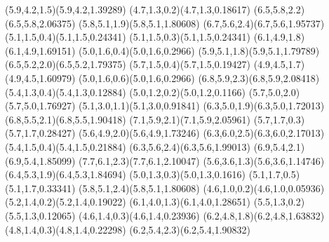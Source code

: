 \pstThreeDLine[linecolor=black](5.9,4.2,1.5)(5.9,4.2,1.39289)
\pstThreeDLine[linecolor=black](4.7,1.3,0.2)(4.7,1.3,0.18617)
\pstThreeDLine[linecolor=black](6.5,5.8,2.2)(6.5,5.8,2.06375)
\pstThreeDLine[linecolor=black](5.8,5.1,1.9)(5.8,5.1,1.80608)
\pstThreeDLine[linecolor=black](6.7,5.6,2.4)(6.7,5.6,1.95737)
\pstThreeDLine[linecolor=black](5.1,1.5,0.4)(5.1,1.5,0.24341)
\pstThreeDLine[linecolor=black](5.1,1.5,0.3)(5.1,1.5,0.24341)
\pstThreeDLine[linecolor=black](6.1,4.9,1.8)(6.1,4.9,1.69151)
\pstThreeDLine[linecolor=black](5.0,1.6,0.4)(5.0,1.6,0.2966)
\pstThreeDLine[linecolor=black](5.9,5.1,1.8)(5.9,5.1,1.79789)
\pstThreeDLine[linecolor=black](6.5,5.2,2.0)(6.5,5.2,1.79375)
\pstThreeDLine[linecolor=black](5.7,1.5,0.4)(5.7,1.5,0.19427)
\pstThreeDLine[linecolor=black](4.9,4.5,1.7)(4.9,4.5,1.60979)
\pstThreeDLine[linecolor=black](5.0,1.6,0.6)(5.0,1.6,0.2966)
\pstThreeDLine[linecolor=black](6.8,5.9,2.3)(6.8,5.9,2.08418)
\pstThreeDLine[linecolor=black](5.4,1.3,0.4)(5.4,1.3,0.12884)
\pstThreeDLine[linecolor=black](5.0,1.2,0.2)(5.0,1.2,0.1166)
\pstThreeDLine[linecolor=black](5.7,5.0,2.0)(5.7,5.0,1.76927)
\pstThreeDLine[linecolor=black](5.1,3.0,1.1)(5.1,3.0,0.91841)
\pstThreeDLine[linecolor=black](6.3,5.0,1.9)(6.3,5.0,1.72013)
\pstThreeDLine[linecolor=black](6.8,5.5,2.1)(6.8,5.5,1.90418)
\pstThreeDLine[linecolor=black](7.1,5.9,2.1)(7.1,5.9,2.05961)
\pstThreeDLine[linecolor=black](5.7,1.7,0.3)(5.7,1.7,0.28427)
\pstThreeDLine[linecolor=black](5.6,4.9,2.0)(5.6,4.9,1.73246)
\pstThreeDLine[linecolor=black](6.3,6.0,2.5)(6.3,6.0,2.17013)
\pstThreeDLine[linecolor=black](5.4,1.5,0.4)(5.4,1.5,0.21884)
\pstThreeDLine[linecolor=black](6.3,5.6,2.4)(6.3,5.6,1.99013)
\pstThreeDLine[linecolor=black](6.9,5.4,2.1)(6.9,5.4,1.85099)
\pstThreeDLine[linecolor=black](7.7,6.1,2.3)(7.7,6.1,2.10047)
\pstThreeDLine[linecolor=black](5.6,3.6,1.3)(5.6,3.6,1.14746)
\pstThreeDLine[linecolor=black](6.4,5.3,1.9)(6.4,5.3,1.84694)
\pstThreeDLine[linecolor=black](5.0,1.3,0.3)(5.0,1.3,0.1616)
\pstThreeDLine[linecolor=black](5.1,1.7,0.5)(5.1,1.7,0.33341)
\pstThreeDLine[linecolor=black](5.8,5.1,2.4)(5.8,5.1,1.80608)
\pstThreeDLine[linecolor=black](4.6,1.0,0.2)(4.6,1.0,0.05936)
\pstThreeDLine[linecolor=black](5.2,1.4,0.2)(5.2,1.4,0.19022)
\pstThreeDLine[linecolor=black](6.1,4.0,1.3)(6.1,4.0,1.28651)
\pstThreeDLine[linecolor=black](5.5,1.3,0.2)(5.5,1.3,0.12065)
\pstThreeDLine[linecolor=black](4.6,1.4,0.3)(4.6,1.4,0.23936)
\pstThreeDLine[linecolor=black](6.2,4.8,1.8)(6.2,4.8,1.63832)
\pstThreeDLine[linecolor=black](4.8,1.4,0.3)(4.8,1.4,0.22298)
\pstThreeDLine[linecolor=black](6.2,5.4,2.3)(6.2,5.4,1.90832)
